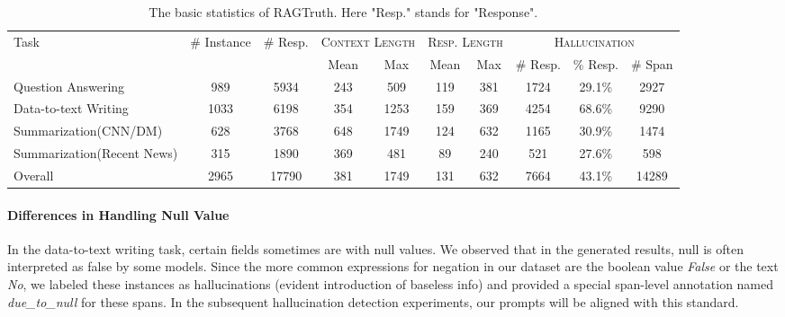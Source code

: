 \documentclass[11pt]{article}
\newcommand{\CorpusName}{RAGTruth}
\begin{document}
\begin{table}[t]
\centering
\scriptsize
\begin{tabular}{l|ccccccccc}
\toprule
\multirow{2}{*}{Task} & \multirow{2}{*}{\# Instance} & \multirow{2}{*}{\# Resp.} & \multicolumn{2}{c}{\textsc{Context Length}} & \multicolumn{2}{c}{\textsc{Resp. Length}} &\multicolumn{3}{c}{\textsc{Hallucination}} \\
\cmidrule(lr){4-5} \cmidrule(lr){6-7} \cmidrule(lr){8-10}
  & & & Mean  & Max  & Mean  & Max & \# Resp. & \% Resp. & \# Span \\
\midrule
Question Answering & 989 & 5934 & 243 & 509 & 119 &381 & 1724 & 29.1\% & 2927 \\
Data-to-text Writing & 1033  & 6198 & 354 & 1253 & 159 & 369 & 4254 & 68.6\% & 9290 \\
Summarization(CNN/DM) & 628 & 3768 & 648 & 1749 & 124 & 632 & 1165 & 30.9\% & 1474 \\
Summarization(Recent News) & 315 & 1890 & 369 & 481  & 89  & 240  & 521 & 27.6\% & 598 \\
\midrule
Overall & 2965 & 17790 & 381 & 1749 & 131 & 632 & 7664 & 43.1\% & 14289 \\
\bottomrule
\end{tabular}
\caption{The basic statistics of \CorpusName. Here "Resp." stands for "Response".}
\label{tab:basic_stat}
\end{table}


\paragraph{Differences in Handling Null Value} In the data-to-text writing task, certain fields sometimes are with null values. We observed that in the generated results, null is often interpreted as false by some models. Since the more common expressions for negation in our dataset are the boolean value \textit{False} or the text \textit{No}, we labeled these instances as hallucinations (evident introduction of baseless info) and provided a special span-level annotation named \textit{due\_to\_null} for these spans. In the subsequent hallucination detection experiments, our prompts will be aligned with this standard.
\end{document}
